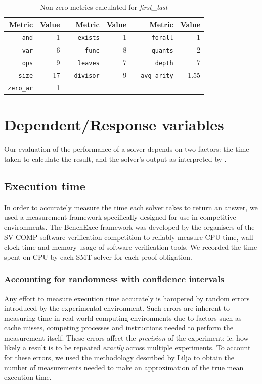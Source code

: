 \begin{table}
	\centering
	\caption{Non-zero metrics calculated for \textit{first\_last}} 
	\label{table:examplemetrics}
	\begin{tabular}
		{|r|r|c|r|r|c|r|r|} \hline
		Metric&Value&&Metric&Value&&Metric&Value \\ \hline
		\texttt{and}&1&&\texttt{exists}&1&&\texttt{forall}&1 \\ \hline
		\texttt{var}&6&&\texttt{func}&8&&\texttt{quants}&2 \\ \hline
		\texttt{ops}&9&&\texttt{leaves}&7&&\texttt{depth}&7 \\ \hline
		\texttt{size}&17&&\texttt{divisor}&9&& \texttt{avg\_arity}&1.55 \\ 
		\hline
		\texttt{zero\_ar}&1&& & && & \\ \hline	
	\end{tabular}
\end{table}


\section{Dependent/Response variables}
\label{sec:dependant}

Our evaluation of the performance of a solver depends on two factors: the time taken to calculate the result, and the solver's output as interpreted by \why.

\subsection{Execution time}
In order to accurately measure the time each solver takes to return an answer, we used a measurement framework specifically designed for use in competitive environments. 
The BenchExec \cite{ Beyer2016,benchexec} framework was developed by the organisers of the SV-COMP \cite{SVCOMP} software verification competition to reliably measure CPU time, wall-clock time and memory usage of software verification tools. 
We recorded the time spent on CPU by each SMT solver for each proof obligation. 

\subsubsection{Accounting for randomness with confidence intervals}
\label{sub:confidence}

Any effort to measure execution time accurately is hampered by random errors introduced by the experimental environment.
Such errors are inherent to measuring time in real world computing environments due to factors such as cache misses, competing processes and instructions needed to perform the measurement itself.   
These errors affect the \textit{precision} of the experiment: ie. how likely a result is to be repeated \textit{exactly} across multiple experiments. 
To account for these errors, we used the methodology described by Lilja \cite{LiljaJ} to obtain the number of measurements needed to make an approximation of the true mean execution time. 

